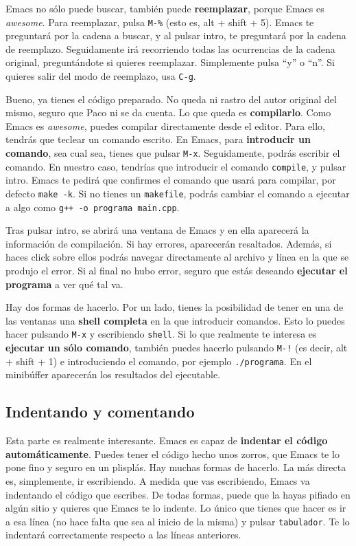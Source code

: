 \documentclass{article}
\begin{document}
Emacs no sólo puede buscar, también puede \textbf{reemplazar}, porque Emacs es \textit{awesome}. Para reemplazar, pulsa \texttt{M-\%} (esto es, alt + shift + 5). Emacs te preguntará por la cadena a buscar, y al pulsar intro, te preguntará por la cadena de reemplazo. Seguidamente irá recorriendo todas las ocurrencias de la cadena original, preguntándote si quieres reemplazar. Simplemente pulsa ``y'' o ``n''. Si quieres salir del modo de reemplazo, usa \texttt{C-g}.

Bueno, ya tienes el código preparado. No queda ni rastro del autor original del mismo, seguro que Paco ni se da cuenta. Lo que queda es \textbf{compilarlo}. Como Emacs es \textit{awesome}, puedes compilar directamente desde el editor. Para ello, tendrás que teclear un comando escrito. En Emacs, para \textbf{introducir un comando}, sea cual sea, tienes que pulsar \texttt{M-x}. Seguidamente, podrás escribir el comando. En nuestro caso, tendrías que introducir el comando \texttt{compile}, y pulsar intro. Emacs te pedirá que confirmes el comando que usará para compilar, por defecto \texttt{make -k}. Si no tienes un \texttt{makefile}, podrás cambiar el comando a ejecutar a algo como \texttt{g++ -o programa main.cpp}.

Tras pulsar intro, se abrirá una ventana de Emacs y en ella aparecerá la información de compilación. Si hay errores, aparecerán resaltados. Además, si haces click sobre ellos podrás navegar directamente al archivo y línea en la que se produjo el error. Si al final no hubo error, seguro que estás deseando \textbf{ejecutar el programa} a ver qué tal va. 

Hay dos formas de hacerlo. Por un lado, tienes la posibilidad de tener en una de las ventanas una \textbf{shell completa} en la que introducir comandos. Esto lo puedes hacer pulsando \texttt{M-x} y escribiendo \texttt{shell}. Si lo que realmente te interesa es \textbf{ejecutar un sólo comando}, también puedes hacerlo pulsando \texttt{M-!} (es decir, alt + shift + 1) e introduciendo el comando, por ejemplo \texttt{./programa}. En el minibúffer aparecerán los resultados del ejecutable.

\subsection*{Indentando y comentando}
\vspace{-0.4cm}
Esta parte es realmente interesante. Emacs es capaz de \textbf{indentar el código automáticamente}. Puedes tener el código hecho unos zorros, que Emacs te lo pone fino y seguro en un plisplás. Hay muchas formas de hacerlo. La más directa es, simplemente, ir escribiendo. A medida que vas escribiendo, Emacs va indentando el código que escribes. De todas formas, puede que la hayas pifiado en algún sitio y quieres que Emacs te lo indente. Lo único que tienes que hacer es ir a esa línea (no hace falta que sea al inicio de la misma) y pulsar \texttt{tabulador}. Te lo indentará correctamente respecto a las líneas anteriores.
\end{document}

